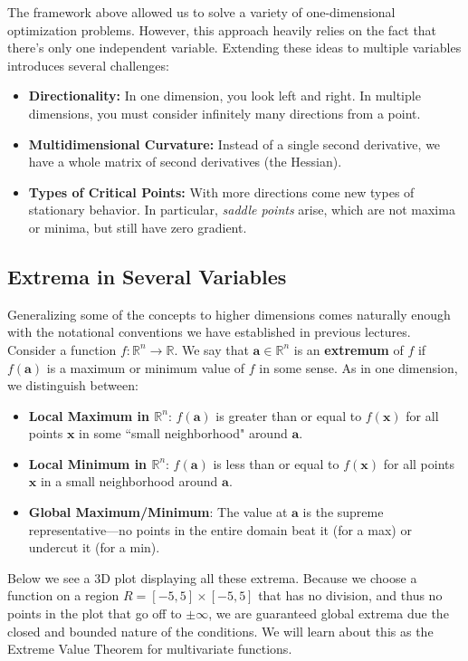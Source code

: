 \noindent The framework above allowed us to solve a variety of one-dimensional optimization problems. However, this approach heavily relies on the fact that there's only one independent variable. Extending these ideas to multiple variables introduces several challenges:
\begin{itemize}
    \item \textbf{Directionality:} In one dimension, you look left and right. In multiple dimensions, you must consider infinitely many directions from a point.
    \item \textbf{Multidimensional Curvature:} Instead of a single second derivative, we have a whole matrix of second derivatives (the Hessian).
    \item \textbf{Types of Critical Points:} With more directions come new types of stationary behavior. In particular, \textit{saddle points} arise, which are not maxima or minima, but still have zero gradient.
\end{itemize}

\subsection*{Extrema in Several Variables} 


\noindent Generalizing some of the concepts to higher dimensions comes naturally enough with the notational conventions we have established in previous lectures. Consider a function \( f: \mathbb{R}^n \to \mathbb{R} \). We say that \( \mathbf{a} \in \mathbb{R}^n \) is an \textbf{extremum} of \( f \) if \( f(\mathbf{a}) \) is a maximum or minimum value of \( f \) in some sense. As in one dimension, we distinguish between:
   
\begin{itemize}
    \item \textbf{Local Maximum in \(\mathbb{R}^n\)}: \( f(\mathbf{a}) \) is greater than or equal to \( f(\mathbf{x}) \) for all points \(\mathbf{x}\) in some ``small neighborhood" around \(\mathbf{a}\).
    \item \textbf{Local Minimum in \(\mathbb{R}^n\)}: \( f(\mathbf{a}) \) is less than or equal to \( f(\mathbf{x}) \) for all points \(\mathbf{x}\) in a small neighborhood around \(\mathbf{a}\).
    \item \textbf{Global Maximum/Minimum}: The value at \(\mathbf{a}\) is the supreme representative—no points in the entire domain beat it (for a max) or undercut it (for a min).
\end{itemize}
\noindent Below we see a 3D plot displaying all these extrema. Because we choose a function on a region $R = [-5,5] \times [-5,5]$ that has no division, and thus no points in the plot that go off to $\pm \infty$, we are guaranteed global extrema due the closed and bounded nature of the conditions. We will learn about this as the Extreme Value Theorem for multivariate functions.

